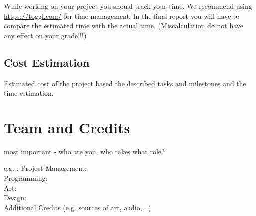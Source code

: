 \documentclass[a4paper]{scrreprt}
\begin{document}
While working on your project you should track your time. 
We recommend using \url{https://toggl.com/} for time management. In the final report you will have to compare the estimated time with the actual time. (Miscalculation do not have any effect on your grade!!!)

\section{Cost Estimation}

Estimated cost of the project based the described tasks and milestones and the  time estimation.  



\chapter{Team and Credits}

most important - who are you, who takes what role? 

e.g. :
Project Management: \\
Programming: \\ 
Art: \\ 
Design: \\ 

Additional Credits (e.g. sources of art, audio,.. ) 


%
%
\end{document}
